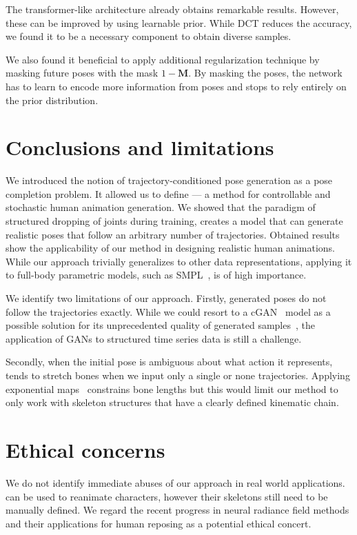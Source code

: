 \documentclass[10pt,twocolumn,letterpaper]{article}
\begin{document}
The transformer-like architecture already obtains remarkable results. However, these can be improved by using learnable prior. While DCT reduces the accuracy, we found it to be a necessary component to obtain diverse samples.

We also found it beneficial to apply additional regularization technique by masking future poses with the mask $1 - \mathbf{M}$. By masking the poses, the network has to learn to encode more information from poses and stops to rely entirely on the prior distribution. 


\section{Conclusions and limitations}
We introduced the notion of trajectory-conditioned pose generation as a pose completion problem. It allowed us to define \trajevae{} --- a method for controllable and stochastic human animation generation.
We showed that the paradigm of structured dropping of joints during training, creates a model that can generate realistic poses that follow an arbitrary number of trajectories. Obtained results show the applicability of our method in designing realistic human animations. While our approach trivially generalizes to other data representations, applying it to full-body parametric models, such as SMPL~\cite{pavlakos2019expressive, zhang2020we}, is of high importance. 

We identify two limitations of our approach. Firstly, generated poses do not follow the trajectories exactly. While we could resort to a cGAN~\cite{goodfellow2014generative} model as a possible solution for its unprecedented quality of generated samples~\cite{karras2019style}, the application of GANs to structured time series data is still a challenge.

Secondly, when the initial pose is ambiguous about what action it represents, \trajevae{} tends to stretch bones when we input only a single or none trajectories. Applying exponential maps~\cite{pavllo2018quaternet} constrains bone lengths but this would limit our method to only work with skeleton structures that have a clearly defined kinematic chain.

\section{Ethical concerns}
We do not identify immediate abuses of our approach in real world applications. \trajevae{} can be used to reanimate characters, however their skeletons still need to be manually defined. We regard the recent progress in neural radiance field \cite{mildenhall2020nerf} methods and their applications for human reposing \cite{su2021nerf} as a potential ethical concert.
\end{document}
